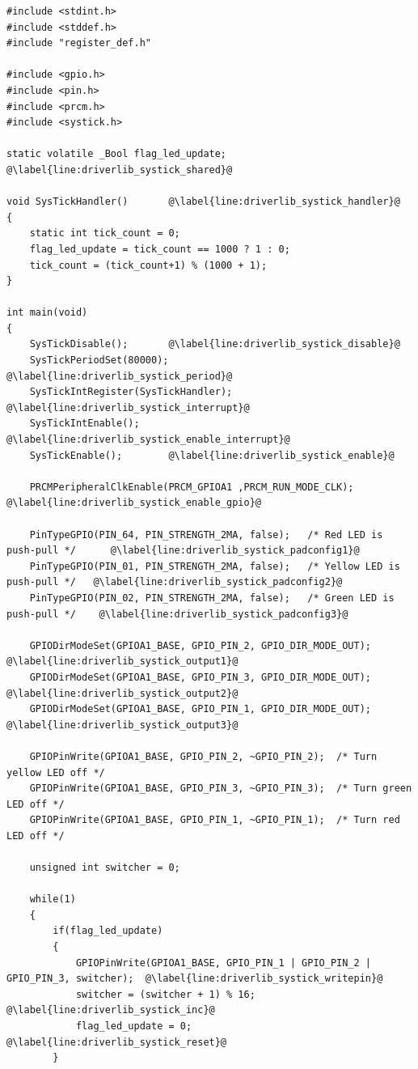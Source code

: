 \newpage
\begin{lstlisting}[style=CStyle, caption={Toggling LEDs according to Table \ref{tab:led_scheme} using Driverlib}, captionpos=b, label={lst:led_systick_driverlib}, escapechar=@]
#include <stdint.h>
#include <stddef.h>
#include "register_def.h"

#include <gpio.h>
#include <pin.h>
#include <prcm.h>
#include <systick.h>

static volatile _Bool flag_led_update;  @\label{line:driverlib_systick_shared}@

void SysTickHandler()       @\label{line:driverlib_systick_handler}@
{
    static int tick_count = 0;
    flag_led_update = tick_count == 1000 ? 1 : 0;
    tick_count = (tick_count+1) % (1000 + 1);
}

int main(void)
{
    SysTickDisable();       @\label{line:driverlib_systick_disable}@
    SysTickPeriodSet(80000);    @\label{line:driverlib_systick_period}@
    SysTickIntRegister(SysTickHandler); @\label{line:driverlib_systick_interrupt}@
    SysTickIntEnable();     @\label{line:driverlib_systick_enable_interrupt}@
    SysTickEnable();        @\label{line:driverlib_systick_enable}@

    PRCMPeripheralClkEnable(PRCM_GPIOA1 ,PRCM_RUN_MODE_CLK);    @\label{line:driverlib_systick_enable_gpio}@

    PinTypeGPIO(PIN_64, PIN_STRENGTH_2MA, false);   /* Red LED is push-pull */      @\label{line:driverlib_systick_padconfig1}@
    PinTypeGPIO(PIN_01, PIN_STRENGTH_2MA, false);   /* Yellow LED is push-pull */   @\label{line:driverlib_systick_padconfig2}@
    PinTypeGPIO(PIN_02, PIN_STRENGTH_2MA, false);   /* Green LED is push-pull */    @\label{line:driverlib_systick_padconfig3}@

    GPIODirModeSet(GPIOA1_BASE, GPIO_PIN_2, GPIO_DIR_MODE_OUT);                     @\label{line:driverlib_systick_output1}@
    GPIODirModeSet(GPIOA1_BASE, GPIO_PIN_3, GPIO_DIR_MODE_OUT);                     @\label{line:driverlib_systick_output2}@
    GPIODirModeSet(GPIOA1_BASE, GPIO_PIN_1, GPIO_DIR_MODE_OUT);                     @\label{line:driverlib_systick_output3}@

    GPIOPinWrite(GPIOA1_BASE, GPIO_PIN_2, ~GPIO_PIN_2);  /* Turn yellow LED off */
    GPIOPinWrite(GPIOA1_BASE, GPIO_PIN_3, ~GPIO_PIN_3);  /* Turn green LED off */
    GPIOPinWrite(GPIOA1_BASE, GPIO_PIN_1, ~GPIO_PIN_1);  /* Turn red LED off */

    unsigned int switcher = 0;

    while(1)
    {
        if(flag_led_update)
        {
            GPIOPinWrite(GPIOA1_BASE, GPIO_PIN_1 | GPIO_PIN_2 | GPIO_PIN_3, switcher);  @\label{line:driverlib_systick_writepin}@
            switcher = (switcher + 1) % 16;                                             @\label{line:driverlib_systick_inc}@
            flag_led_update = 0;                                                        @\label{line:driverlib_systick_reset}@
        }


\end{lstlisting}
